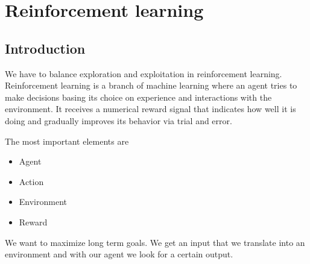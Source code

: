\section{Reinforcement learning}
\subsection{Introduction}

We have to balance exploration and exploitation in reinforcement learning. Reinforcement learning is a branch of machine learning where an agent tries to make decisions basing its choice on experience and interactions with the environment. It receives a numerical reward signal that indicates how well it is doing and gradually improves its behavior via trial and error. 

\vspace{10pt}


The most important elements are 
\begin{itemize}
    \item Agent
    \item Action
    \item Environment
    \item Reward
\end{itemize}

We want to maximize long term goals. We get an input that we translate into an environment and with our agent we look for a certain output. 










